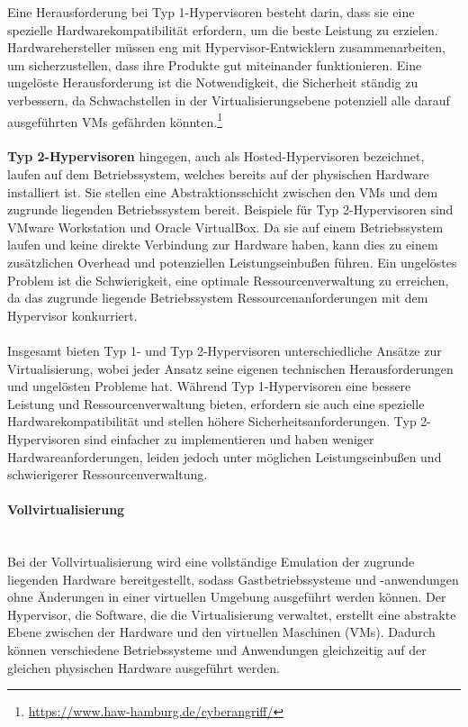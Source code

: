 Eine Herausforderung bei Typ 1-Hypervisoren besteht darin, dass sie eine spezielle Hardwarekompatibilität erfordern, um die beste Leistung zu erzielen. Hardwarehersteller müssen eng mit Hypervisor-Entwicklern zusammenarbeiten, um sicherzustellen, dass ihre Produkte gut miteinander funktionieren. Eine ungelöste Herausforderung ist die Notwendigkeit, die Sicherheit ständig zu verbessern, da Schwachstellen in der Virtualisierungsebene potenziell alle darauf ausgeführten VMs gefährden könnten.\footnote{\url{https://www.haw-hamburg.de/cyberangriff/}}
\\\\
\textbf{Typ 2-Hypervisoren} hingegen, auch als Hosted-Hypervisoren bezeichnet, laufen auf dem Betriebssystem, welches bereits auf der physischen Hardware installiert ist. Sie stellen eine Abstraktionsschicht zwischen den VMs und dem zugrunde liegenden Betriebssystem bereit. Beispiele für Typ 2-Hypervisoren sind VMware Workstation und Oracle VirtualBox.
Da sie auf einem Betriebssystem laufen und keine direkte Verbindung zur Hardware haben, kann dies zu einem zusätzlichen Overhead und potenziellen Leistungseinbußen führen. Ein ungelöstes Problem ist die Schwierigkeit, eine optimale Ressourcenverwaltung zu erreichen, da das zugrunde liegende Betriebssystem Ressourcenanforderungen mit dem Hypervisor konkurriert.
\\\\
Insgesamt bieten Typ 1- und Typ 2-Hypervisoren unterschiedliche Ansätze zur Virtualisierung, wobei jeder Ansatz seine eigenen technischen Herausforderungen und ungelösten Probleme hat. Während Typ 1-Hypervisoren eine bessere Leistung und Ressourcenverwaltung bieten, erfordern sie auch eine spezielle Hardwarekompatibilität und stellen höhere Sicherheitsanforderungen. Typ 2-Hypervisoren sind einfacher zu implementieren und haben weniger Hardwareanforderungen, leiden jedoch unter möglichen Leistungseinbußen und schwierigerer Ressourcenverwaltung.

\paragraph{Vollvirtualisierung\\\\}
Bei der Vollvirtualisierung wird eine vollständige Emulation der zugrunde liegenden Hardware bereitgestellt, sodass Gastbetriebssysteme und -anwendungen ohne Änderungen in einer virtuellen Umgebung ausgeführt werden können. Der Hypervisor, die Software, die die Virtualisierung verwaltet, erstellt eine abstrakte Ebene zwischen der Hardware und den virtuellen Maschinen (VMs). Dadurch können verschiedene Betriebssysteme und Anwendungen gleichzeitig auf der gleichen physischen Hardware ausgeführt werden.

